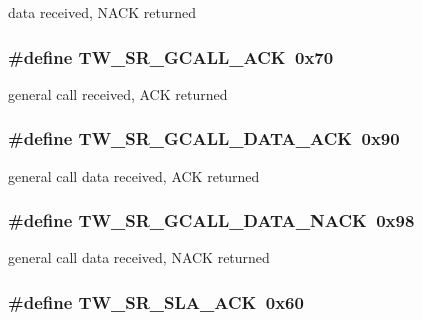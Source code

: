 \label{group__util__twi_ga6c0fa701fe9d96b0b7df29e8af154f94}
data received, NACK returned \hypertarget{group__util__twi_ga6eb3b4230887a8b73d7787ff231ea911}{
\subsubsection[{TW\_\-SR\_\-GCALL\_\-ACK}]{\setlength{\rightskip}{0pt plus 5cm}\#define TW\_\-SR\_\-GCALL\_\-ACK~0x70}}
\label{group__util__twi_ga6eb3b4230887a8b73d7787ff231ea911}
general call received, ACK returned \hypertarget{group__util__twi_ga4abaad098fd92bed63719ffb01802c8d}{
\subsubsection[{TW\_\-SR\_\-GCALL\_\-DATA\_\-ACK}]{\setlength{\rightskip}{0pt plus 5cm}\#define TW\_\-SR\_\-GCALL\_\-DATA\_\-ACK~0x90}}
\label{group__util__twi_ga4abaad098fd92bed63719ffb01802c8d}
general call data received, ACK returned \hypertarget{group__util__twi_ga42234278f9b01b9af75dbbc617b97890}{
\subsubsection[{TW\_\-SR\_\-GCALL\_\-DATA\_\-NACK}]{\setlength{\rightskip}{0pt plus 5cm}\#define TW\_\-SR\_\-GCALL\_\-DATA\_\-NACK~0x98}}
\label{group__util__twi_ga42234278f9b01b9af75dbbc617b97890}
general call data received, NACK returned \hypertarget{group__util__twi_ga9e9e761d674793772e6b3f77fc9d7fab}{
\subsubsection[{TW\_\-SR\_\-SLA\_\-ACK}]{\setlength{\rightskip}{0pt plus 5cm}\#define TW\_\-SR\_\-SLA\_\-ACK~0x60}}
\label{group__util__twi_ga9e9e761d674793772e6b3f77fc9d7fab}
